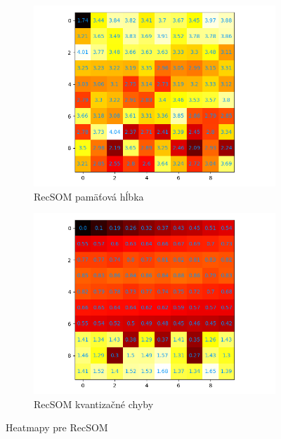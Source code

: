 \begin{figure}[H]
    \centering
    \begin{subfigure}{.5\textwidth}
        \centering
        \includegraphics[width=\linewidth]{assets/recsom_memory_span}
        \caption{RecSOM pamäťová hĺbka}
        \label{fig:sub1}
    \end{subfigure}%
    \begin{subfigure}{.5\textwidth}
        \centering
        \includegraphics[width=\linewidth]{assets/recsom_quantization_errors}
        \caption{RecSOM kvantizačné chyby}
        \label{fig:sub2}
    \end{subfigure}
    \caption{Heatmapy pre RecSOM}
    \label{fig:test}
\end{figure}

